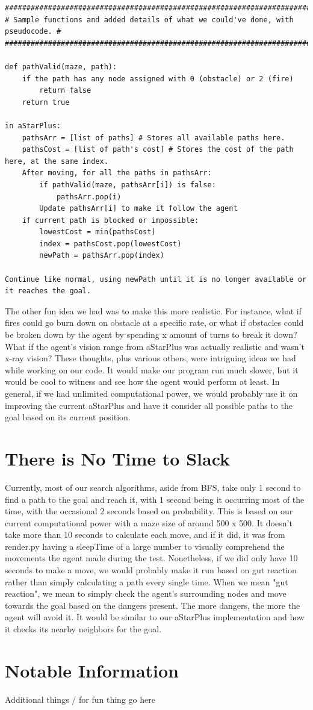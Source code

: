 \documentclass[11pt]{article}
\begin{document}
\begin{verbatim}
#################################################################################
# Sample functions and added details of what we could've done, with pseudocode. #
#################################################################################

def pathValid(maze, path):
    if the path has any node assigned with 0 (obstacle) or 2 (fire)
        return false
    return true

in aStarPlus:
    pathsArr = [list of paths] # Stores all available paths here.
    pathsCost = [list of path's cost] # Stores the cost of the path here, at the same index.
    After moving, for all the paths in pathsArr:
        if pathValid(maze, pathsArr[i]) is false:
            pathsArr.pop(i)
        Update pathsArr[i] to make it follow the agent
    if current path is blocked or impossible:
        lowestCost = min(pathsCost)
        index = pathsCost.pop(lowestCost)
        newPath = pathsArr.pop(index)
        
Continue like normal, using newPath until it is no longer available or it reaches the goal.
\end{verbatim}
The other fun idea we had was to make this more realistic. For instance, what if fires could go burn down on obstacle at a specific rate, or what if obstacles could be broken down by the agent by spending x amount of turns to break it down? What if the agent's vision range from aStarPlus was actually realistic and wasn't x-ray vision? These thoughts, plus various others, were intriguing ideas we had while working on our code. It would make our program run much slower, but it would be cool to witness and see how the agent would perform at least.
In general, if we had unlimited computational power, we would probably use it on improving the current aStarPlus and have it consider all possible paths to the goal based on its current position.
	\pagebreak
\section{There is No Time to Slack}
Currently, most of our search algorithms, aside from BFS, take only 1 second to find a path to the goal and reach it, with 1 second being it occurring most of the time, with the occasional 2 seconds based on probability. This is based on our current computational power with a maze size of around 500 x 500. It doesn't take more than 10 seconds to calculate each move, and if it did, it was from render.py having a sleepTime of a large number to visually comprehend the movements the agent made during the test.
Nonetheless, if we did only have 10 seconds to make a move, we would probably make it run based on gut reaction rather than simply calculating a path every single time. When we mean "gut reaction", we mean to simply check the agent's surrounding nodes and move towards the goal based on the dangers present. The more dangers, the more the agent will avoid it. It would be similar to our aStarPlus implementation and how it checks its nearby neighbors for the goal.
	\pagebreak
\section{Notable Information}
Additional things / for fun thing go here
\end{document}
